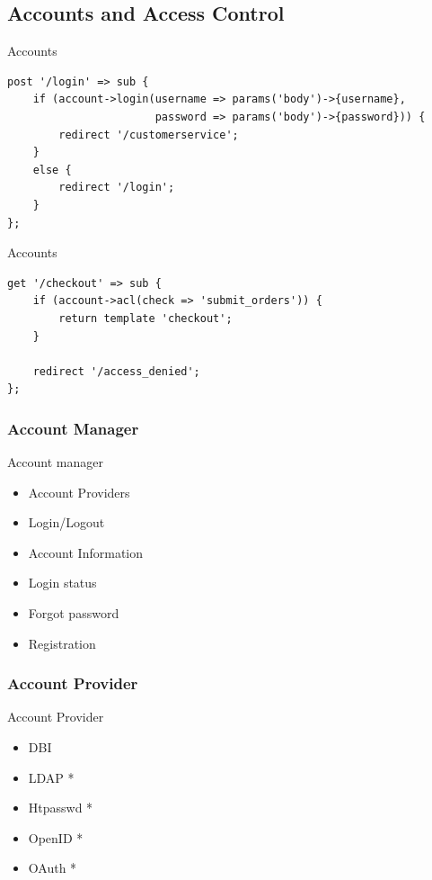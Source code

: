 \subsection{Accounts and Access Control}

\begin{frame}[fragile]{Accounts}
\begin{lstlisting}
post '/login' => sub {
    if (account->login(username => params('body')->{username},
                       password => params('body')->{password})) {
        redirect '/customerservice';
    }
    else {
        redirect '/login';
    }
};
\end{lstlisting}
\end{frame}

\begin{frame}[fragile]{Accounts}
\begin{lstlisting}
get '/checkout' => sub {
    if (account->acl(check => 'submit_orders')) {
        return template 'checkout';
    }
    
    redirect '/access_denied';
};
\end{lstlisting}
\end{frame}

\subsubsection{Account Manager}
\begin{frame}{Account manager}
\begin{itemize}
\item Account Providers
\item Login/Logout
\item Account Information
\item Login status
\item Forgot password
\item Registration
\end{itemize}
\end{frame}

\subsubsection{Account Provider}
\begin{frame}{Account Provider}
\begin{itemize}
\item DBI 
\item LDAP *
\item Htpasswd * 
\item OpenID *
\item OAuth *
\end{itemize}
\end{frame}

